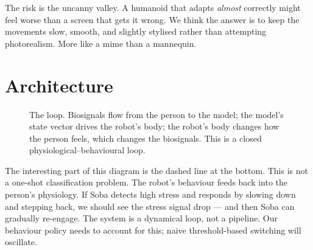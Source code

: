 \documentclass[11pt,a4paper]{article}
\begin{document}
The risk is the uncanny valley. A humanoid that adapts \emph{almost} correctly might feel worse than a screen that gets it wrong. We think the answer is to keep the movements slow, smooth, and slightly stylised rather than attempting photorealism. More like a mime than a mannequin.

\section{Architecture}

\begin{figure}[H]
\centering
{}
\caption{The loop. Biosignals flow from the person to the model; the model's state vector drives the robot's body; the robot's body changes how the person feels, which changes the biosignals. This is a closed physiological--behavioural loop.}
\label{fig:arch}
\end{figure}

The interesting part of this diagram is the dashed line at the bottom. This is not a one-shot classification problem. The robot's behaviour feeds back into the person's physiology. If Soba detects high stress and responds by slowing down and stepping back, we should see the stress signal drop --- and then Soba can gradually re-engage. The system is a dynamical loop, not a pipeline. Our behaviour policy needs to account for this; naive threshold-based switching will oscillate.
\end{document}
